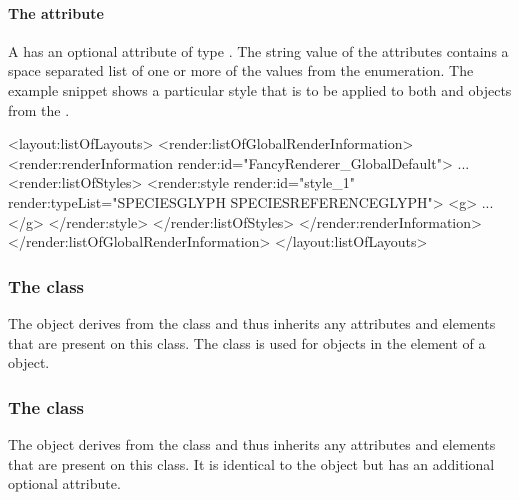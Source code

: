 \paragraph{The \fixttspace{} attribute}

A \Style has an optional attribute  of type
. The string value of the  attributes contains 
a space separated list of one or more of the values from the \StyleType enumeration.
 The example snippet shows a particular style that is to be applied to 
both  and  objects from 
the \LayoutPackage.

\pagebreak
{\footnotesize
\begin{example}
<layout:listOfLayouts>
   <render:listOfGlobalRenderInformation>
      <render:renderInformation render:id="FancyRenderer_GlobalDefault">
             ...
        <render:listOfStyles>
             <render:style render:id="style_1" render:typeList="SPECIESGLYPH SPECIESREFERENCEGLYPH">
                <g> ... </g>
             </render:style> 
        </render:listOfStyles>
      </render:renderInformation>
   </render:listOfGlobalRenderInformation>
</layout:listOfLayouts>
\end{example}
}

\subsubsection{The  class}
\label{globalstyle-class}

The \GlobalStyle object derives from the \Style class and thus inherits
any attributes and elements that are present on this class. The \GlobalStyle 
class is used for objects in the \ListOfGlobalStyles element of a 
\GlobalRenderInformation object.



\subsubsection{The  class}
\label{localstyle-class}

The \LocalStyle object derives from the \Style class and thus inherits
any attributes and elements that are present on this class. It is identical to 
the \GlobalStyle object but has an additional optional  attribute.

